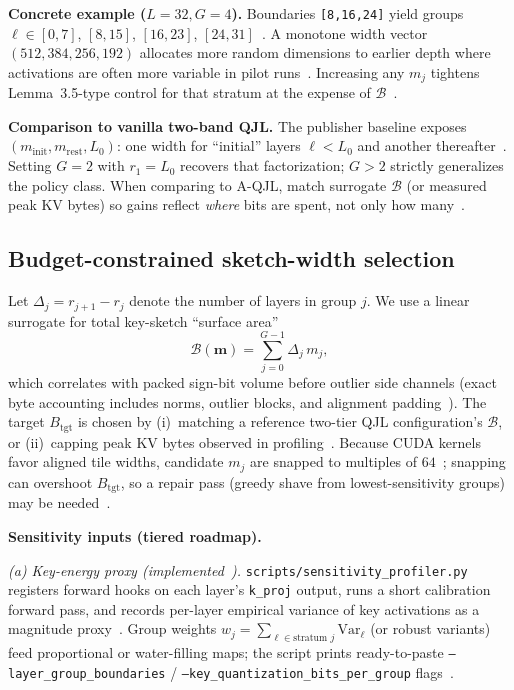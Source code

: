 \documentclass[conference]{IEEEtran}
\begin{document}
\textbf{Concrete example ($L{=}32,G{=}4$).}
Boundaries \texttt{[8,16,24]} yield groups \(\ell\in[0,7]\), \([8,15]\), \([16,23]\), \([24,31]\)~\cite{zandieh2024aqjl-repo}. A monotone width vector \((512,384,256,192)\) allocates more random dimensions to earlier depth where activations are often more variable in pilot runs~\cite{presentation_mqjl}. Increasing any \(m_j\) tightens Lemma~3.5-type control for that stratum at the expense of \(\mathcal{B}\)~\cite{zandieh2024qjl}.

\textbf{Comparison to vanilla two-band QJL.} The publisher baseline exposes \((m_{\mathrm{init}},m_{\mathrm{rest}},L_0)\): one width for ``initial'' layers \(\ell<L_0\) and another thereafter~\cite{zandieh2024qjl}. Setting \(G{=}2\) with \(r_1=L_0\) recovers that factorization; \(G{>}2\) strictly generalizes the policy class. When comparing to A-QJL, match surrogate \(\mathcal{B}\) (or measured peak KV bytes) so gains reflect \emph{where} bits are spent, not only how many~\cite{presentation_mqjl}.

\subsection{Budget-constrained sketch-width selection}
\label{sec:budget}

Let \(\Delta_j=r_{j+1}-r_j\) denote the number of layers in group \(j\). We use a linear surrogate for total key-sketch ``surface area''
\begin{equation}
\mathcal{B}(\mathbf{m})=\sum_{j=0}^{G-1}\Delta_j \, m_j ,
\label{eq:budget}
\end{equation}
which correlates with packed sign-bit volume before outlier side channels (exact byte accounting includes norms, outlier blocks, and alignment padding~\cite{zandieh2024qjl,qjlkernel}). The target \(B_{\mathrm{tgt}}\) is chosen by (i)~matching a reference two-tier QJL configuration's \(\mathcal{B}\), or (ii)~capping peak KV bytes observed in profiling~\cite{presentation_mqjl}. Because CUDA kernels favor aligned tile widths, candidate \(m_j\) are snapped to multiples of \(64\)~\cite{zandieh2024qjl}; snapping can overshoot \(B_{\mathrm{tgt}}\), so a repair pass (greedy shave from lowest-sensitivity groups) may be needed~\cite{presentation_mqjl}.

\textbf{Sensitivity inputs (tiered roadmap).}

\textit{(a) Key-energy proxy (implemented~\cite{zandieh2024aqjl-repo}).}
\texttt{scripts/sensitivity\_profiler.py} registers forward hooks on each layer's \texttt{k\_proj} output, runs a short calibration forward pass, and records per-layer empirical variance of key activations as a magnitude proxy~\cite{presentation_mqjl}. Group weights \(w_j=\sum_{\ell\in\text{stratum }j}\mathrm{Var}_\ell\) (or robust variants) feed proportional or water-filling maps; the script prints ready-to-paste \texttt{--layer\_group\_boundaries} / \texttt{--key\_quantization\_bits\_per\_group} flags~\cite{zandieh2024aqjl-repo}.
\end{document}
